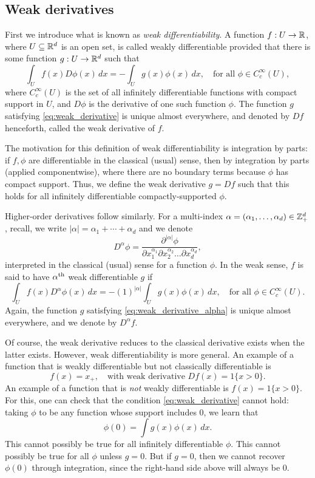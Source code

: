 \documentclass{article}
\begin{document}
\subsection{Weak derivatives}

First we introduce what is known as \emph{weak differentiability}. A function $f
: U \to \mathbb{R}$, where $U \subseteq \mathbb{R}^d$ is an open set, is called weakly
differentiable provided that there is some function $g : U \to \mathbb{R}^d$ such that
\begin{equation}
\label{eq:weak_derivative}
\int_U f(x) D \phi(x) \, dx = - \int_U g(x) \phi(x) \, dx,
\quad \text{for all $\phi \in C_c^\infty(U)$}, 
\end{equation}
where $C_c^\infty(U)$ is the set of all infinitely differentiable functions with
compact support in $U$, and $D\phi$ is the derivative of one such function
$\phi$. The function $g$ satisfying \eqref{eq:weak_derivative} is unique almost
everywhere, and denoted by $Df$ henceforth, called the weak derivative of $f$.

The motivation for this definition of weak differentiability is integration by
parts: if $f,\phi$ are differentiable in the classical (usual) sense, then
 by
integration by parts (applied componentwise), where there are no boundary terms
because $\phi$ has compact support. Thus, we define the weak derivative $g = Df$
such that this holds for all infinitely differentiable compactly-supported
$\phi$.

Higher-order derivatives follow similarly. For a multi-index
$\alpha=(\alpha_1,\dots,\alpha_d) \in \mathbb{Z}^d_+$, recall, we write $|\alpha| =
\alpha_1 + \cdots + \alpha_d$ and we denote  
\[
D^\alpha \phi = \frac{\partial^{|\alpha|} \phi}{\partial x_1^{\alpha_1} \partial 
  x_2^{\alpha_2} \dots \partial x_d^{\alpha_d}},
\]
interpreted in the classical (usual) sense for a function $\phi$. In the weak
sense, $f$ is said to have $\alpha^{\text{th}}$ weak differentiable $g$ if 
\begin{equation}
\label{eq:weak_derivative_alpha}
\int_U f(x) D^\alpha \phi(x) \, dx = - (1)^{|\alpha|} \int_U g(x) \phi(x) \, dx,
\quad \text{for all $\phi \in C_c^\infty(U)$}.   
\end{equation}
Again, the function $g$ satisfying \eqref{eq:weak_derivative_alpha} is unique
almost everywhere, and we denote by $D^\alpha f$.

Of course, the weak derivative reduces to the classical derivative exists when
the latter exists. However, weak differentiability is more general. An example
of a function that is weakly differentiable but not classically differentiable
is
\[
f(x) = x_+, \quad \text{with weak derivative $Df(x) = 1\{x > 0\}$.} 
\]
An example of a function that is \emph{not} weakly differentiable is $f(x) =
1\{x > 0\}$. For this, one can check that the condition
\eqref{eq:weak_derivative} cannot hold: taking $\phi$ to be any function whose
support includes 0, we learn that
\[
\phi(0) = \int g(x) \phi(x) \, dx.
\]
This cannot possibly be true for all infinitely differentiable $\phi$. This
cannot possibly be true for all $\phi$ unless $g=0$. But if $g=0$, then we
cannot recover $\phi(0)$ through integration, since the right-hand side above
will always be 0.   
\end{document}
